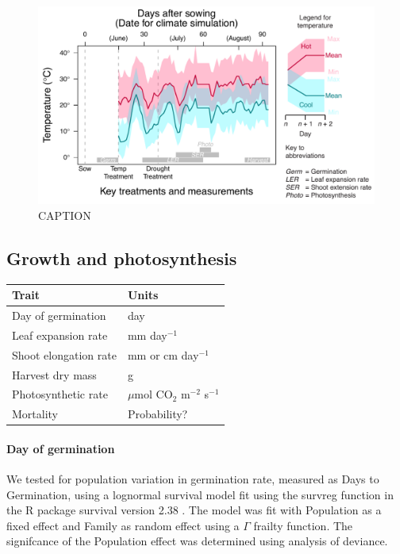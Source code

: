 \documentclass[11pt, oneside]{article}\usepackage[]{graphicx}\usepackage[]{color}
\newcommand{\pkg}[1]{{\fontseries{b}\selectfont #1}}
\begin{document}
\begin{figure}[h!]
	\centerline{\includegraphics[width=1\textwidth]{Figures/Figure_ExptlDes.pdf}}
	\fontsize{10}{12}
	\selectfont
	\caption[Experimental Design]{CAPTION}
	\label{fig:Fig_ExptlDes}
\end{figure}

\subsection*{Growth and photosynthesis}

\begin{table}[ht]
   \centering
   \begin{tabular}{@{} ll @{}}
      \toprule
  Trait & Units \\
      \midrule
  Day of germination  & day \\
  Leaf expansion rate  &  mm day$^{-1}$  \\
  Shoot elongation rate  &  mm or cm day$^{-1}$  \\
  Harvest dry mass &  g  \\
  Photosynthetic rate &  $\mu$mol CO$_2$ m$^{-2}$ s$^{-1}$\\
  Mortality &  Probability?  \\
	    \bottomrule
   \end{tabular}
   \label{table:Table_traits}
\end{table}

\paragraph{Day of germination} We tested for population variation in germination rate, measured as Days to Germination, using a lognormal survival model fit using the survreg function in the R package \pkg{survival} version 2.38 \citep{Therneau_2015}. The model was fit with Population as a fixed effect and Family as random effect using a $\Gamma$ frailty function. The signifcance of the Population effect was determined using analysis of deviance.
\end{document}
